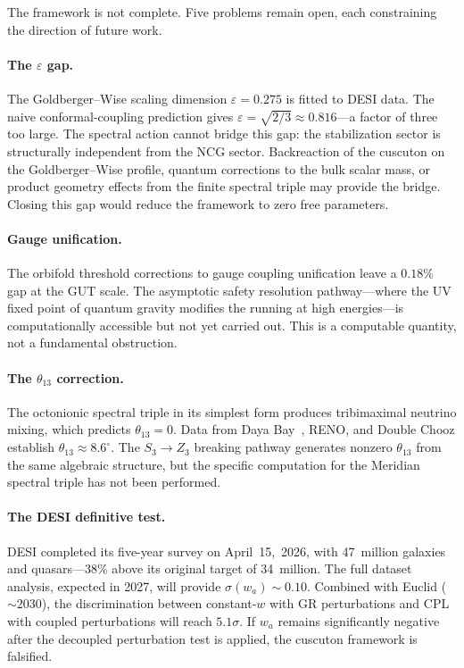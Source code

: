 The framework is not complete. Five problems remain open, each
constraining the direction of future work.

\paragraph{The $\varepsilon$ gap.}
The Goldberger--Wise scaling dimension $\varepsilon = 0.275$ is fitted
to DESI data. The naive conformal-coupling prediction gives
$\varepsilon = \sqrt{2/3} \approx 0.816$---a factor of three too
large. The spectral action cannot bridge this gap: the stabilization
sector is structurally independent from the NCG sector. Backreaction
of the cuscuton on the Goldberger--Wise profile, quantum corrections
to the bulk scalar mass, or product geometry effects from the finite
spectral triple may provide the bridge. Closing this gap would reduce
the framework to zero free parameters.

\paragraph{Gauge unification.}
The orbifold threshold corrections to gauge coupling unification leave
a $0.18\%$ gap at the GUT scale. The asymptotic safety resolution
pathway---where the UV fixed point of quantum gravity modifies the
running at high energies---is computationally accessible but not yet
carried out. This is a computable quantity, not a fundamental
obstruction.

\paragraph{The $\theta_{13}$ correction.}
The octonionic spectral triple in its simplest form produces
tribimaximal neutrino mixing, which predicts $\theta_{13} = 0$. Data
from Daya Bay~\cite{ch4:DayaBay2012}, RENO, and Double Chooz
establish $\theta_{13} \approx 8.6^\circ$. The $S_3 \to Z_3$ breaking
pathway generates nonzero $\theta_{13}$ from the same algebraic
structure, but the specific computation for the Meridian spectral
triple has not been performed.

\paragraph{The DESI definitive test.}
DESI completed its five-year survey on April~15,~2026, with 47~million
galaxies and quasars---$38\%$ above its original target of 34~million.
The full dataset analysis, expected in 2027, will provide
$\sigma(w_a) \sim 0.10$. Combined with Euclid ($\sim\!2030$), the
discrimination between constant-$w$ with GR perturbations and CPL with
coupled perturbations will reach $5.1\sigma$. If $w_a$ remains
significantly negative after the decoupled perturbation test is
applied, the cuscuton framework is falsified.

